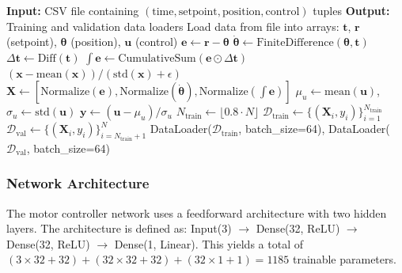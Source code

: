 \begin{algorithm}[htbp]
\caption{Data Loading and Preprocessing}
\label{alg:data_preprocessing}
\begin{algorithmic}[1]
\State \textbf{Input:} CSV file containing $(\text{time}, \text{setpoint}, \text{position}, \text{control})$ tuples
\State \textbf{Output:} Training and validation data loaders
\State
\State Load data from file into arrays: $\mathbf{t}$, $\mathbf{r}$ (setpoint), $\boldsymbol{\theta}$ (position), $\mathbf{u}$ (control)
\State
\State {}
\State $\mathbf{e} \gets \mathbf{r} - \boldsymbol{\theta}$ 
\State $\dot{\boldsymbol{\theta}} \gets \text{FiniteDifference}(\boldsymbol{\theta}, \mathbf{t})$ 
\State $\Delta \mathbf{t} \gets \text{Diff}(\mathbf{t})$
\State $\int\mathbf{e} \gets \text{CumulativeSum}(\mathbf{e} \odot \Delta\mathbf{t})$ 
\State
{}
    \State \Return $(\mathbf{x} - \text{mean}(\mathbf{x})) / (\text{std}(\mathbf{x}) + \epsilon)$
\EndFunction
\State
\State $\mathbf{X} \gets [\text{Normalize}(\mathbf{e}), \text{Normalize}(\dot{\boldsymbol{\theta}}), \text{Normalize}(\int\mathbf{e})]$ 
\State $\mu_u \gets \text{mean}(\mathbf{u})$, $\sigma_u \gets \text{std}(\mathbf{u})$
\State $\mathbf{y} \gets (\mathbf{u} - \mu_u) / \sigma_u$ 
\State
\State $N_{\text{train}} \gets \lfloor 0.8 \cdot N \rfloor$
\State $\mathcal{D}_{\text{train}} \gets \{(\mathbf{X}_i, y_i)\}_{i=1}^{N_{\text{train}}}$
\State $\mathcal{D}_{\text{val}} \gets \{(\mathbf{X}_i, y_i)\}_{i=N_{\text{train}}+1}^{N}$
\State
\State \Return DataLoader($\mathcal{D}_{\text{train}}$, batch\_size=64), DataLoader($\mathcal{D}_{\text{val}}$, batch\_size=64)
\end{algorithmic}
\end{algorithm}

\subsubsection{Network Architecture}

The motor controller network uses a feedforward architecture with two hidden layers. The architecture is defined as: Input(3) $\to$ Dense(32, ReLU) $\to$ Dense(32, ReLU) $\to$ Dense(1, Linear). This yields a total of $(3 \times 32 + 32) + (32 \times 32 + 32) + (32 \times 1 + 1) = 1185$ trainable parameters.

